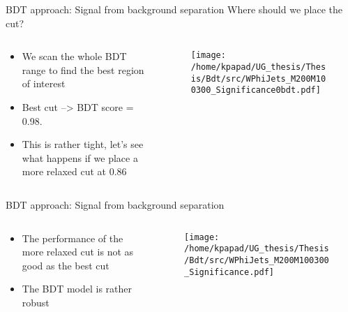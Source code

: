 \documentclass[bigger]{beamer}
\begin{document}
\begin{frame}[label={sec:org86e3948}]{BDT approach: Signal from background separation}
\alert{Where should we place the cut?}
\begin{columns}
\begin{column}{0.5\columnwidth}
\begin{itemize}
\item We scan the whole BDT range to find the best region of interest
\item Best cut --> BDT score = 0.98.
\item This is rather tight, let's see what happens if we place a more relaxed cut at 0.86
\end{itemize}
\end{column}
\begin{column}{0.5\columnwidth}
\begin{figure}
\centering
\texttt{[image: /home/kpapad/UG\_thesis/Thesis/Bdt/src/WPhiJets\_M200M100300\_Significance0bdt.pdf]}
\end{figure}
\end{column}
\end{columns}
\end{frame}
\begin{frame}[label={sec:org6e47759}]{BDT approach: Signal from background separation}
\begin{columns}
\begin{column}{0.5\columnwidth}
\begin{itemize}
\item The performance of the more relaxed cut is not as good as the best cut
\item The BDT model is rather robust
\end{itemize}
\end{column}
\begin{column}{0.5\columnwidth}
\begin{figure}
\centering
\texttt{[image: /home/kpapad/UG\_thesis/Thesis/Bdt/src/WPhiJets\_M200M100300\_Significance.pdf]}
\end{figure}
\end{column}
\end{columns}
\end{frame}
\end{document}
